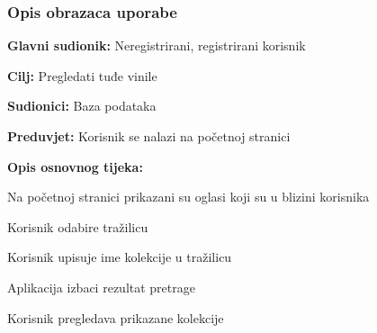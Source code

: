 				
				\subsubsection{Opis obrazaca uporabe}
					

				\noindent {}
					\begin{packed_item}
	
						\item \textbf{Glavni sudionik: }Neregistrirani, registrirani korisnik
						\item  \textbf{Cilj:} Pregledati tuđe vinile
						\item  \textbf{Sudionici:} Baza podataka
						\item  \textbf{Preduvjet:} Korisnik se nalazi na početnoj stranici
						\item  \textbf{Opis osnovnog tijeka:}
						
						\item[] \begin{packed_enum}
	
							\item Na početnoj stranici prikazani su oglasi koji su u blizini korisnika
							\item Korisnik odabire tražilicu
							\item Korisnik upisuje ime kolekcije u tražilicu
							\item Aplikacija izbaci rezultat pretrage
							\item Korisnik pregledava prikazane kolekcije

						\end{packed_enum}						
					\end{packed_item}
					
